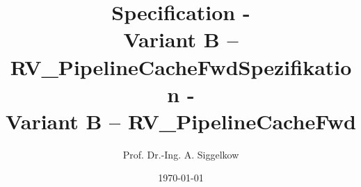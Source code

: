 \documentclass[a4paper,12pt]{book}
\newcommand{\TEXTa}{./}
\newcommand{\asvariant}{Variant B -- RV\_PipelineCacheFwd}
\begin{document}
{\title{Specification - \aschip \\ \asvariant}}
{\title{Spezifikation - \aschip \\ \asvariant}}
\author{Prof. Dr.-Ing. A. Siggelkow}
\date{\today}
\begin{titlepage}
  \maketitle
  \thispagestyle{empty}
\end{titlepage}
\thispagestyle{empty}
\newpage
\setcounter{chapter}{0}
%

\printbibliography
\end{document}
